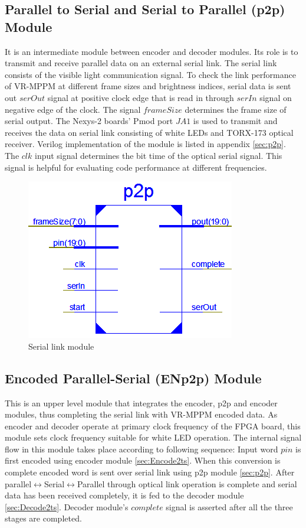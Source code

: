 \subsection{Parallel to Serial and Serial to Parallel (p2p) Module}
It is an intermediate module between encoder and decoder modules. Its role is to transmit and receive parallel data on an external serial link. The serial link consists of the visible light communication signal. To check the link performance of VR-MPPM at different frame sizes and brightness indices, serial data is sent out $serOut$ signal at positive clock edge that is read in through $serIn$ signal on negative edge of the clock. The signal $frameSize$ determines the frame size of serial output. The Nexys-2 boards' Pmod port $JA1$ is used to transmit and receives the data on serial link consisting of white LEDs and TORX-173 optical receiver. Verilog implementation of the module is listed in appendix \ref{sec:p2p}. The $clk$ input signal determines the bit time of the optical serial signal. This signal is helpful for evaluating code performance at different frequencies.
\begin{figure}[!htbp]
	\centering
	\includegraphics[width=.5\textwidth]{./Figures/p2p.png}
	\caption{Serial link module}
	\label{fig:p2p}
\end{figure}

\subsection{Encoded Parallel-Serial (ENp2p) Module}
This is an upper level module that integrates the encoder, p2p and encoder modules, thus completing the serial link with VR-MPPM encoded data. As encoder and decoder operate at primary clock frequency of the FPGA board, this module sets clock frequency suitable for white LED operation. The internal signal flow in this module takes place according to following sequence: Input word $pin$ is first encoded using encoder module \ref{sec:Encode2ts}. When this conversion is complete encoded word is sent over serial link using p2p module \ref{sec:p2p}. After parallel$\leftrightarrow$Serial$\leftrightarrow$Parallel through optical link operation is complete and serial data has been received completely, it is fed to the decoder module \ref{sec:Decode2ts}. Decoder module's $complete$ signal is asserted after all the three stages are completed.

